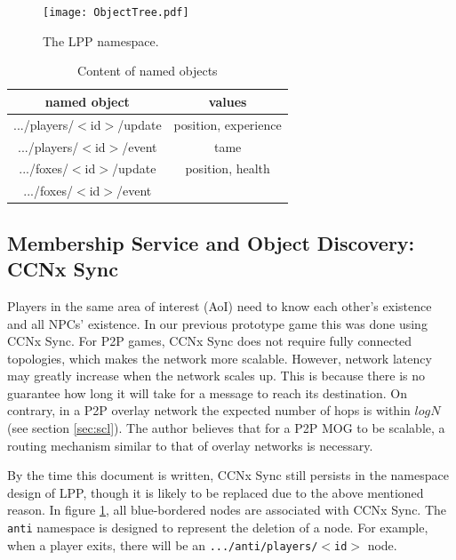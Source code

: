 \documentclass{article}
\begin{document}
\begin{figure}
\begin{center}
\texttt{[image: ObjectTree.pdf]}
\caption{The LPP namespace.}
\label{fig:ns}
\end{center}
\end{figure}

\begin{table}
\caption{Content of named objects}
\begin{center}
\begin{tabular}{|c|c|}
\hline
named object & values \\
\hline
.../players/$<$id$>$/update & position, experience \\
\hline
.../players/$<$id$>$/event & tame \\
\hline
.../foxes/$<$id$>$/update & position, health \\
\hline
.../foxes/$<$id$>$/event & \\
\hline
\end{tabular}
\end{center}
\label{tb:content}
\end{table}%

\subsection{Membership Service and Object Discovery: CCNx Sync}
\label{sec:ms}
Players in the same area of interest (AoI) need to know each other's existence and all NPCs' existence. In our previous prototype game this was done using CCNx Sync. For P2P games, CCNx Sync does not require fully connected topologies, which makes the network more scalable. However, network latency may greatly increase when the network scales up. This is because there is no guarantee how long it will take for a message to reach its destination. On contrary, in a P2P overlay network the expected number of hops is within $logN$ (see section \ref{sec:scl}). The author believes that for a P2P MOG to be scalable, a routing mechanism similar to that of overlay networks is necessary.

By the time this document is written, CCNx Sync still persists in the namespace design of LPP, though it is likely to be replaced due to the above mentioned reason. In figure \ref{fig:ns}, all blue-bordered nodes are associated with CCNx Sync. The \texttt{anti} namespace is designed to represent the deletion of a node. For example, when a player exits, there will be an \texttt{.../anti/players/$<$id$>$} node.
\end{document}
